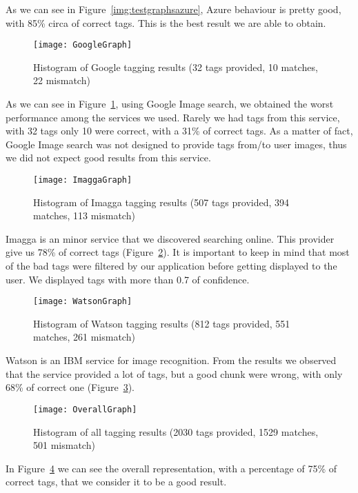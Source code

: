 As we can see in Figure~\ref{img:testgraphsazure}, Azure behaviour is pretty 
good, with 85\% circa of correct tags. This is the best result we are able to 
obtain.

\begin{figure}[H]
\centering
\texttt{[image: GoogleGraph]}
\caption{Histogram of Google tagging results (32 tags provided, 10 matches, 22 
mismatch)}
\label{img:testgraphgoogle}
\end{figure}

As we can see in Figure~\ref{img:testgraphgoogle}, using Google Image search, we 
obtained the worst performance among the services we used. Rarely we had tags 
from this service, with 32 tags only 10 were correct, with a 31\% of correct 
tags. As a matter of fact, Google Image search was not designed to provide tags 
from/to user images, thus we did not expect good results from this service.

\begin{figure}[H]
\centering
\texttt{[image: ImaggaGraph]}
\caption{Histogram of Imagga tagging results (507 tags provided, 394 matches, 
113 mismatch)}
\label{img:testgraphimagga}
\end{figure}

Imagga is an minor service that we discovered searching online. This provider 
give us 78\% of correct tags (Figure~\ref{img:testgraphimagga}). It is important 
to keep in mind that most of the bad tags were filtered by our application 
before getting displayed to the user. We displayed tags with more than 0.7 of 
confidence.

\begin{figure}[H]
\centering
\texttt{[image: WatsonGraph]}
\caption{Histogram of Watson tagging results (812 tags provided, 551 matches, 
261 mismatch)}
\label{img:testgraphwatson}
\end{figure}

Watson is an IBM service for image recognition. From the results we observed 
that the service provided a lot of tags, but a good chunk were wrong, with only 
68\% of correct one (Figure~\ref{img:testgraphwatson}).

\begin{figure}[H]
\centering
\texttt{[image: OverallGraph]}
\caption{Histogram of all tagging results (2030 tags provided, 1529 matches, 501 
mismatch)}
\label{img:testgraphoverall}
\end{figure}

In Figure~\ref{img:testgraphoverall} we can see the overall representation, with 
a percentage of 75\% of correct tags, that we consider it to be a good result.

